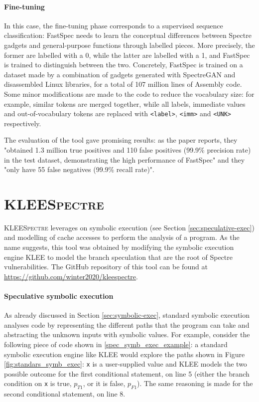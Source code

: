 \documentclass[target=mst,aauheader=aics]{thud}
\theoremstyle{definition}
\begin{document}
	\paragraph{Fine-tuning} In this case, the fine-tuning phase corresponds to a supervised sequence classification: FastSpec needs to learn the conceptual differences between Spectre gadgets and general-purpose functions through labelled pieces. More precisely, the former are labelled with a 0, while the latter are labelled with a 1, and FastSpec is trained to distinguish between the two. Concretely, FastSpec is trained on a dataset made by a combination of gadgets generated with SpectreGAN and disassembled Linux libraries, for a total of 107 million lines of Assembly code. Some minor modifications are made to the code to reduce the vocabulary size: for example, similar tokens are merged together, while all labels, immediate values and out-of-vocabulary tokens are replaced with \texttt{<label>}, \texttt{<imm>} and \texttt{<UNK>} respectively.
	
	The evaluation of the tool gave promising results: as the paper reports, they "obtained 1.3 million true positives and 110 false positives (99.9\% precision rate) in the test dataset, demonstrating the high performance of FastSpec" and they "only have 55 false negatives (99.9\% recall rate)".
	
	\section{\textsc{KLEESpectre}}\label{sec:kleespectre}
	\textsc{KLEESpectre} \cite{Wang2019} leverages on symbolic execution (see Section \ref{sec:speculative-exec}) and modelling of cache accesses to perform the analysis of a program. As the name suggests, this tool was obtained by modifying the symbolic execution engine KLEE \cite{Cadar2008} to model the branch speculation that are the root of Spectre vulnerabilities. The GitHub repository of this tool can be found at \url{https://github.com/winter2020/kleespectre}.
	\paragraph{Speculative symbolic execution} As already discussed in Section \ref{sec:symbolic-exec}, standard symbolic execution analyses code by representing the different paths that the program can take and abstracting the unknown inputs with symbolic values. For example, consider the following piece of code shown in \ref{spec_symb_exec_example}: a standard symbolic execution engine like KLEE would explore the paths shown in Figure \ref{fig:standars_symb_exec}: \texttt{x} is a user-supplied value and KLEE models the two possible outcome for the first conditional statement, on line 5 (either the branch condition on \texttt{x} is true, $p_{T1}$, or it is false, $p_{F1}$). The same reasoning is made for the second conditional statement, on line 8.
	
\end{document}
